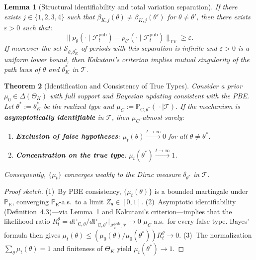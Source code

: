 \documentclass[12pt]{article}
\newtheorem{theorem}{Theorem}[section]
\newtheorem{lemma}[theorem]{Lemma}
\theoremstyle{definition}
\theoremstyle{remark}
\newcommand{\ProbE}{\mathbb{P}_{\mathrm{E}}}
\newcommand{\ProbC}[1]{\mathbb{P}_{\mathrm{C},#1}}
\newcommand{\1}{\mathbf{1}}
\begin{document}
\begin{lemma}[Structural identifiability and total variation separation]
\label{lem:hazard-separation}
If there exists $j\in\{1,2,3,4\}$ such that $\beta_{K,j}(\theta)\neq\beta_{K,j}(\theta')$ for $\theta\neq\theta'$, then there exists $\varepsilon>0$ such that:
\[
\bigl\| p_\theta(\cdot\mid \mathcal{F}_t^{\mathrm{pub}})-p_{\theta'}(\cdot\mid \mathcal{F}_t^{\mathrm{pub}})\bigr\|_{\mathrm{TV}}\ge \varepsilon.
\]
If moreover the set $\mathcal{S}_{\theta,\theta_K^\ast}$ of periods with this separation is infinite and $\underline{\varepsilon}>0$ is a uniform lower bound, then Kakutani's criterion \parencite{Kakutani1948} implies mutual singularity of the path laws of $\theta$ and $\theta_K^\ast$ in $\mathcal{T}$.
\end{lemma}

\begin{theorem}[Identification and Consistency of True Types]
\label{thm:posterior-consistency}
Consider a prior $\mu_0\in\Delta(\Theta_K)$ with full support and Bayesian updating consistent with the PBE. Let $\theta^\ast:=\theta_K^\ast$ be the realized type and $\mu_C:=\ProbC{\theta^\ast}(\,\cdot\mid\mathcal{T})$. If the mechanism is \textbf{asymptotically identifiable} in $\mathcal{T}$, then $\mu_C$-almost surely:
\begin{enumerate}
\item \textbf{Exclusion of false hypotheses}: $\mu_t(\theta)\xrightarrow{t\to\infty}0$ for all $\theta\neq\theta^\ast$.
\item \textbf{Concentration on the true type}: $\mu_t(\theta^\ast)\xrightarrow{t\to\infty}1$.
\end{enumerate}
Consequently, $\{\mu_t\}$ converges weakly to the Dirac measure $\delta_{\theta^\ast}$ in $\mathcal{T}$.
\end{theorem}

\begin{proof}[Proof sketch]
(1)~By PBE consistency, $\{\mu_t(\theta)\}$ is a bounded martingale under $\ProbE$, converging $\ProbE$-a.s.\ to a limit $Z_\theta\in[0,1]$. (2)~Asymptotic identifiability (Definition~4.3)---via Lemma~\ref{lem:hazard-separation} and Kakutani's criterion---implies that the likelihood ratio $R_t^\theta=d\ProbC{\theta}/d\ProbC{\theta^\ast}\big|_{\mathcal{F}_t^{\mathrm{pub}},\mathcal{T}}\to 0$ $\mu_C$-a.s.\ for every false type. Bayes' formula then gives $\mu_t(\theta)\le(\mu_0(\theta)/\mu_0(\theta^\ast))R_t^\theta\to 0$. (3)~The normalization $\sum_\theta\mu_t(\theta)=1$ and finiteness of $\Theta_K$ yield $\mu_t(\theta^\ast)\to 1$.
\end{proof}
\end{document}
